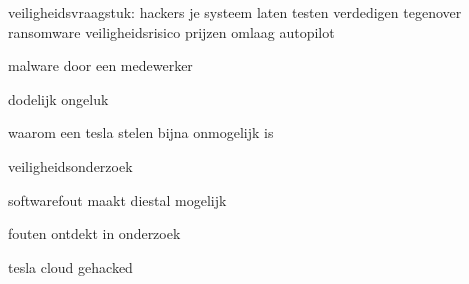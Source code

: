 \cite{cbrook06082021TeslaInsideDataThreft}

\cite{shilling25022021Tesla}
veiligheidsvraagstuk: hackers je systeem laten testen
verdedigen tegenover ransomware
veiligheidsrisico
prijzen omlaag
autopilot

\cite{randall05112019modelSurvey}
malware door een medewerker

\cite{}
dodelijk ongeluk

\cite{}

\cite{fottrell03092018TeslaSecurityChecks}
waarom een tesla stelen bijna onmogelijk is



veiligheidsonderzoek



softwarefout maakt diestal mogelijk


\cite{kirk26112020modelX}
fouten ontdekt in onderzoek

\cite{}

\cite{bbc24022021hyundaiBatteryFireFix}







tesla cloud gehacked


\cite{hawkins22102022}



\cite{gritti24062020tesladataengine}


\cite{bouchard07052019teslaDeepLearning}


\cite{Srikanth2019teslabigdata}

\cite{rangaiah25022020teslaAI}

\cite{marr08012018taslabigdataAI}

\cite{bdickson29072020teslalevelfive}

\cite{dcruz17062022tesladesignthink}






\cite{mcfarland22042021selfdrivingrisks}

\cite{hawkins18032021fedgovinvest}

\cite{berry21042021teslacrashtexas}

\cite{hull23072021regulatorsaftercrash}

\cite{wikiTeslaAutopilot}

\cite{nhtsaAutomatedVehiclesSafety}

\cite{dowling23042021autopilottricking}

\cite{wilson19042021teslacrashregulators}

